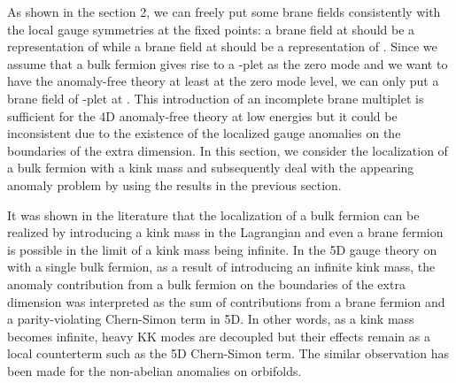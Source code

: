 \documentclass[a4paper,12pt]{article}
\begin{document}
As shown in the section 2, we can freely put some brane fields  
consistently with the local gauge symmetries at the fixed points: 
a brane field at \coordHE{} should be a representation of \coordHE{} while
a brane field at \coordHE{} should be a representation 
of \coordHE{}. Since we assume that a bulk fermion gives 
rise to a \coordHE{}-plet as the zero mode and we want to have 
the anomaly-free theory at least at the zero mode level, 
we can only put a brane field of \coordHE{}-plet at \coordHE{}. 
This introduction of an incomplete brane multiplet is
sufficient for the 4D anomaly-free theory at low energies but it could be 
inconsistent due to the existence of the localized gauge anomalies 
on the boundaries of the extra dimension. In this section, we consider
the localization of a bulk fermion with a kink mass and subsequently deal 
with the appearing anomaly problem by using the results in the previous 
section. 

It was shown in the literature that the localization of a bulk fermion 
can be realized by introducing a kink mass in the Lagrangian and 
even a brane fermion is possible in the limit of a kink mass being 
infinite\cite{ah}. 
In the 5D \coordHE{} gauge theory on \coordHE{} with a single bulk fermion, 
as a result of introducing an infinite kink mass,
the anomaly contribution from a bulk fermion on the boundaries of the extra
dimension was interpreted as the sum 
of contributions from a brane fermion and a parity-violating 
Chern-Simon term in 5D\cite{ah}. 
In other words, as a kink mass becomes infinite, 
heavy KK modes are decoupled but their effects remain as a local counterterm
such as the 5D Chern-Simon term. The similar observation has been made
for the non-abelian anomalies on orbifolds\cite{kkl}. 
\end{document}
